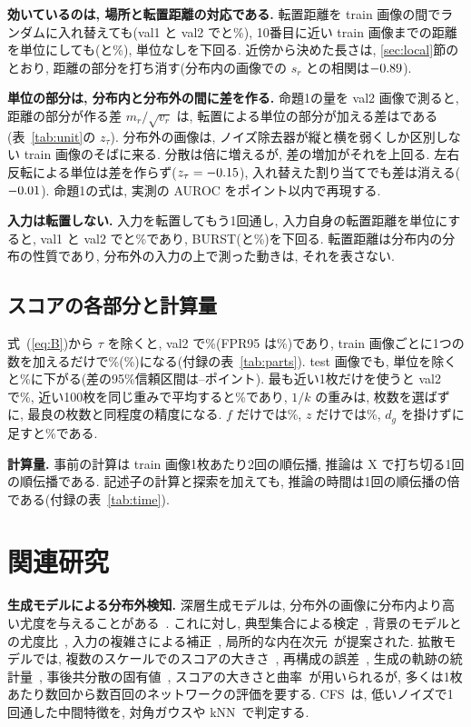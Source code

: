 \documentclass[MIRU,submit]{miru2025j}
\newcommand{\method}{BURST}                 %
\renewcommand{\eqref}[1]{(\ref{#1})}
\begin{document}
\textbf{効いているのは, 場所と転置距離の対応である.} 転置距離を train 画像の間でランダムに入れ替えても(val1 と val2 で\nValShufOne{}と\nValShufTwo\%), 10番目に近い train 画像までの距離を単位にしても(\nValNnOne{}と\nValNnTwo\%), 単位なしを下回る. 近傍から決めた長さは, \ref{sec:local}節のとおり, 距離の部分を打ち消す(分布内の画像での $s_r$ との相関は$-0.89$).

\textbf{単位の部分は, 分布内と分布外の間に差を作る.} 命題1の量を val2 画像で測ると, 距離の部分が作る差 $m_r/\sqrt{v_r}$ は\nZA, 転置による単位の部分が加える差は\nZtTr{}である(表~\ref{tab:unit}の $z_\tau$). 分布外の画像は, ノイズ除去器が縦と横を弱くしか区別しない train 画像のそばに来る. 分散は\nVrTr{}倍に増えるが, 差の増加がそれを上回る. 左右反転による単位は差を作らず($z_\tau=-0.15$), 入れ替えた割り当てでも差は消える($-0.01$). 命題1の式は, 実測の AUROC を\nBnGapMax{}ポイント以内で再現する.

\textbf{入力は転置しない.} 入力を転置してもう1回通し, 入力自身の転置距離を単位にすると, val1 と val2 で\nValOwnOne{}と\nValOwnTwo\%であり, \method(\nValFullTrOne{}と\nValFullTrTwo\%)を下回る. 転置距離は分布内の分布の性質であり, 分布外の入力の上で測った動きは, それを表さない.

\subsection{スコアの各部分と計算量}
\label{sec:parts}
式~\eqref{eq:B}から $\tau$ を除くと, val2 で\nValNoneTwo\%(FPR95 は\nValNoneFpr\%)であり, train 画像ごとに1つの数を加えるだけで\nValTrTwo\%(\nValTrFpr\%)になる(付録の表~\ref{tab:parts}). test 画像でも, 単位を除くと\nNoUnitT\%に下がる(差の95\%信頼区間は\nGapNoUnitLoT--\nGapNoUnitHiT{}ポイント). 最も近い1枚だけを使うと val2 で\nValRoneTwo\%, 近い100枚を同じ重みで平均すると\nValRhundTwo\%であり, $1/k$ の重みは, 枚数を選ばずに, 最良の枚数と同程度の精度になる. $f$ だけでは\nValFonlyTwo\%, $z$ だけでは\nValZonlyTwo\%, $d_g$ を掛けずに足すと\nValNoDTwo\%である.

\textbf{計算量.} 事前の計算は train 画像1枚あたり2回の順伝播, 推論は X で打ち切る1回の順伝播である. 記述子の計算と探索を加えても, 推論の時間は1回の順伝播の\nAllX{}倍である(付録の表~\ref{tab:time}).

\section{関連研究}
\label{sec:related}
\textbf{生成モデルによる分布外検知.} 深層生成モデルは, 分布外の画像に分布内より高い尤度を与えることがある~\cite{nalisnick2019deep}. これに対し, 典型集合による検定~\cite{nalisnick2019typ}, 背景のモデルとの尤度比~\cite{ren2019lr}, 入力の複雑さによる補正~\cite{serra2020input}, 局所的な内在次元~\cite{kamkari2024geometric}が提案された. 拡散モデルでは, 複数のスケールでのスコアの大きさ~\cite{mahmood2021msma}, 再構成の誤差~\cite{graham2023ddpmood}, 生成の軌跡の統計量~\cite{heng2024diffpath}, 事後共分散の固有値~\cite{shoushtari2026eigenscore}, スコアの大きさと曲率~\cite{barkley2026scoped}が用いられるが, 多くは1枚あたり数回から数百回のネットワークの評価を要する. CFS~\cite{rouzoumka2026cfs}は, 低いノイズで1回通した中間特徴を, 対角ガウスや kNN~\cite{sun2022knn}で判定する.
\end{document}

